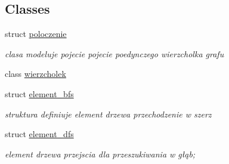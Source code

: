 \subsection*{\-Classes}
\begin{DoxyCompactItemize}
\item 
struct \hyperlink{structpoloczenie}{poloczenie}
\begin{DoxyCompactList}\small\item\em clasa modeluje pojecie pojecie poedynczego wierzcholka grafu \end{DoxyCompactList}\item 
class \hyperlink{classwierzcholek}{wierzcholek}
\item 
struct \hyperlink{structelement__bfs}{element\-\_\-bfs}
\begin{DoxyCompactList}\small\item\em struktura definiuje element drzewa przechodzenie w szerz \end{DoxyCompactList}\item 
struct \hyperlink{structelement__dfs}{element\-\_\-dfs}
\begin{DoxyCompactList}\small\item\em element drzewa przejscia dla przeszukiwania w głąb; \end{DoxyCompactList}\end{DoxyCompactItemize}
